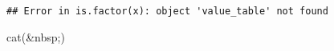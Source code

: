 \documentclass[
]{article}
\newenvironment{Shaded}{\begin{snugshade}}{\end{snugshade}}
\newcommand{\FunctionTok}[1]{\textcolor[rgb]{0.00,0.00,0.00}{#1}}
\newcommand{\NormalTok}[1]{#1}
\newcommand{\StringTok}[1]{\textcolor[rgb]{0.31,0.60,0.02}{#1}}
\begin{document}
\begin{minipage}[t]{0.7\linewidth}
\begin{verbatim}
## Error in is.factor(x): object 'value_table' not found
\end{verbatim}

\end{minipage}
 \vspace*{-7mm} 

\begin{minipage}[t]{0.3\linewidth}

\begin{Shaded}
\begin{Highlighting}[]
\FunctionTok{cat}\NormalTok{(}\StringTok{\textquotesingle{}\&nbsp;\textquotesingle{}}\NormalTok{)}
\end{Highlighting}
\end{Shaded}

~

\end{minipage}%
\end{document}
